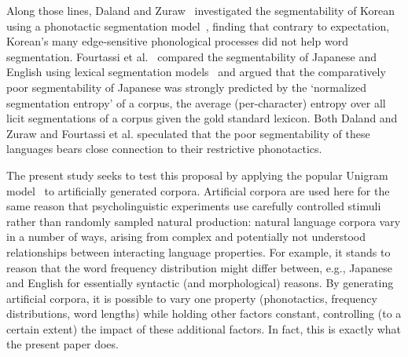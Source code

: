 \documentclass[11pt]{article}
\begin{document}
Along those lines, Daland and Zuraw~ investigated the segmentability of Korean using a phonotactic segmentation model~\cite{Daland11a}, finding that contrary to expectation, Korean's many edge-sensitive phonological processes did not help word segmentation. %
Fourtassi et al.~ compared the segmentability of Japanese and English using lexical segmentation models~\cite{Goldwater09a,Johnson09a} and argued that the comparatively poor segmentability of Japanese was strongly predicted by the `normalized segmentation entropy' of a corpus, the average (per-character) entropy over all licit segmentations of a corpus given the gold standard lexicon. Both Daland and Zuraw and Fourtassi et al. speculated that the poor segmentability of these languages bears close connection to their restrictive phonotactics.

The present study seeks to test this proposal by applying the popular Unigram model~\cite{Brent99a,Goldwater07c,Goldwater09a} to artificially generated corpora. Artificial corpora are used here for the same reason that psycholinguistic experiments use carefully controlled stimuli rather than randomly sampled natural production: natural language corpora vary in a number of ways, arising from complex and potentially not understood relationships between interacting language properties. %
For example, it stands to reason that the word frequency distribution might differ between, e.g., Japanese and English for essentially syntactic (and morphological) reasons. %
By generating artificial corpora, it is possible to vary one property (phonotactics, frequency distributions, word lengths) while holding other factors constant, controlling (to a certain extent) the impact of these additional factors. In fact, this is exactly what the present paper does.
\end{document}
